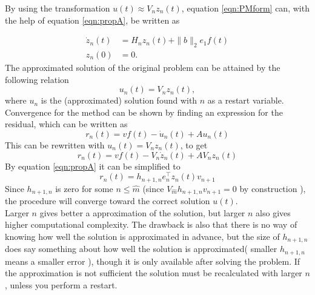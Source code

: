 By using the transformation $u(t) \approx V_n z_n(t)$, equation \eqref{eqn:PMform} can, with the help of equation \eqref{eqn:propA}, be written as

\begin{equation}
\begin{aligned}
\dot{z}_n(t) &= H_n z_n(t) + \| b\|_2 e_1 f(t)  \\
z_n(0) &= 0.
\label{eqn:KPMi}
\end{aligned}
\end{equation}
The approximated solution of the original problem can be attained by the following relation
\begin{equation*}
u_n(t) = V_n z_n(t),
\end{equation*}
where $u_n$ is the (approximated) solution found with $n$ as a restart variable. \\

Convergence for the method can be shown by finding an expression for the residual, which can be written as
\begin{equation*}
r_n(t) = v f(t) -\dot{u}_n(t) + A u_n(t)
\end{equation*}
This can be rewritten with $u_n(t) = V_n z_n(t)$, to get
\begin{equation*}
r_n(t) = v f(t) - V_n \dot{z}_n(t) + A V_n z_n(t)
\end{equation*}
By equation \eqref{eqn:propA} it can be simplified to
\begin{equation}
r_n(t) = h_{n+1,n} e_n^\top z_n(t) v_{n+1}
\label{eqn:Aresidual}
\end{equation}
Since $h_{n+1,n}$ is zero for some $n \leq \hat{m}$ (since $V_{\hat{m}} h_{n+1,n} v_{n+1} = 0 $ by construction ), the procedure will converge toward the correct solution $u(t)$. \\

Larger $n$ gives better a approximation of the solution, but larger $n$ also gives higher computational complexity. The drawback is also that there is no way of knowing how well the solution is approximated in advance, but the size of $h_{n+1,n}$ does say something about how well the solution is approximated( smaller $h_{n+1,n}$ means a smaller error ), though it is only available after solving the problem. If the approximation is not sufficient the solution must be recalculated with larger $n$, unless you perform a restart. \\

